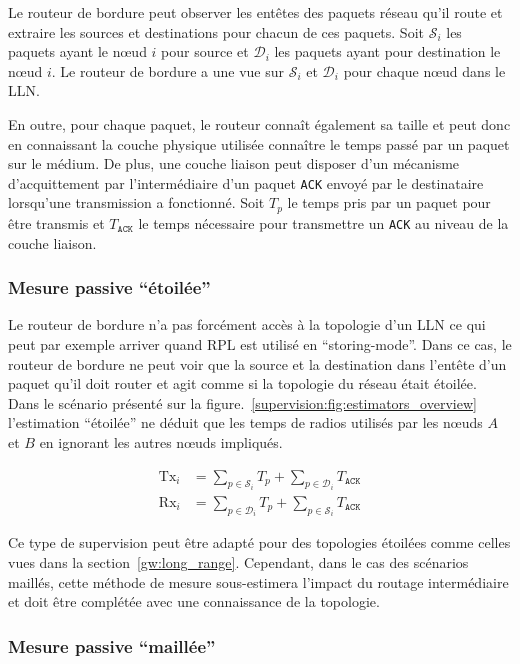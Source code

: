 Le routeur de bordure peut observer les entêtes des paquets réseau qu'il route et extraire les sources et destinations pour chacun de ces paquets.
Soit $\mathcal{S}_i$ les paquets ayant le nœud $i$ pour source et  $\mathcal{D}_i$ les paquets ayant pour destination le nœud $i$.
Le routeur de bordure a une vue sur $\mathcal{S}_i$ et $\mathcal{D}_i$ pour chaque nœud dans le \ac{LLN}.

En outre, pour chaque paquet, le routeur connaît également sa taille et peut donc en connaissant la couche physique utilisée connaître le temps passé par un paquet sur le médium.
De plus, une couche liaison peut disposer d'un mécanisme d'acquittement par l'intermédiaire d'un paquet \texttt{ACK} envoyé par le destinataire lorsqu'une transmission a fonctionné.
Soit $T_p$ le temps pris par un paquet pour être transmis et $T_{\texttt{ACK}}$ le temps nécessaire pour transmettre un \texttt{ACK} au niveau de la couche liaison.

\subsubsection{Mesure passive ``étoilée''}
\label{supervision:noinfo_estimator}

Le routeur de bordure n'a pas forcément accès à la topologie d'un \ac{LLN} ce qui peut par exemple arriver quand \ac{RPL} est utilisé en ``storing-mode''.
Dans ce cas, le routeur de bordure ne peut voir que la source et la destination dans l'entête d'un paquet qu'il doit router et agit comme si la topologie du réseau était étoilée.
Dans le scénario présenté sur la figure.~\ref{supervision:fig:estimators_overview} l'estimation ``étoilée'' ne déduit que les temps de radios utilisés par les nœuds $A$ et $B$ en ignorant les autres nœuds impliqués.

\begin{align}
  \textrm{Tx}_i &= \sum_{p \in \mathcal{S}_i}{T_p} + \sum_{p \in \mathcal{D}_i}{T_{\texttt{ACK}}}\\
  \textrm{Rx}_i &= \sum_{p \in \mathcal{D}_i}{T_p} + \sum_{p \in \mathcal{S}_i}{T_{\texttt{ACK}}}
\end{align}

Ce type de supervision peut être adapté pour des topologies étoilées comme celles vues dans la section~\ref{gw:long_range}.
Cependant, dans le cas des scénarios maillés, cette méthode de mesure sous-estimera l'impact du routage intermédiaire et doit être complétée avec une connaissance de la topologie.

\subsubsection{Mesure passive ``maillée''}
\label{supervision:route_estimator}

